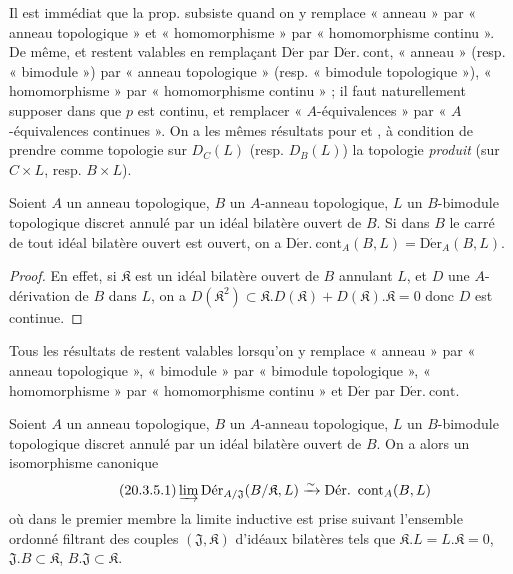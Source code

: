 \begin{env}[20.3.2]
\label{0.20.3.2-fr}
Il est immédiat que la prop.  subsiste quand on y remplace
« anneau » par « anneau topologique » et « homomorphisme » par
« homomorphisme continu ». De même,  et
 restent valables en remplaçant $\operatorname{D\acute{e}r}$ par
$\operatorname{D\acute{e}r.\ cont}$, « anneau » (resp. « bimodule ») par « anneau
topologique » (resp. « bimodule topologique »), « homomorphisme » par
« homomorphisme continu » ; il faut naturellement supposer dans
 que $p$ est continu, et remplacer « $A$-équivalences » par
« $A$-équivalences continues ». On a les mêmes résultats pour
 et , à condition de prendre comme
topologie sur $D_C(L)$ (resp. $D_B(L)$) la topologie \emph{produit} (sur
$C\times L$, resp. $B\times L$).
\end{env}

\begin{proposition}[20.3.3]
\label{0.20.3.3-fr}
Soient $A$ un anneau topologique, $B$ un $A$-anneau topologique, $L$ un
$B$-bimodule topologique discret annulé par un idéal bilatère ouvert de $B$.
Si dans $B$ le carré de tout idéal bilatère ouvert est ouvert, on a
$\operatorname{D\acute{e}r.\ cont}_A(B,L)=\operatorname{D\acute{e}r}_A(B,L)$.
\end{proposition}

\begin{proof}
En effet, si $\mathfrak{K}$ est un idéal bilatère ouvert de $B$ annulant $L$,
et $D$ une $A$-dérivation de $B$ dans $L$, on a
$D(\mathfrak{K}^2)\subset\mathfrak{K}.D(\mathfrak{K})+
D(\mathfrak{K}).\mathfrak{K}=0$  donc $D$ est continue.
\end{proof}

\begin{env}[20.3.4]
\label{0.20.3.4-fr}
Tous les résultats de  restent valables lorsqu'on y remplace
« anneau » par « anneau topologique », « bimodule » par « bimodule
topologique », « homomorphisme » par « homomorphisme continu » et
$\operatorname{D\acute{e}r}$ par $\operatorname{D\acute{e}r.\ cont}$.
\end{env}

\begin{proposition}[20.3.5]
\label{0.20.3.5-fr}
Soient $A$ un anneau topologique, $B$ un $A$-anneau topologique, $L$ un
$B$-bimodule topologique discret annulé par un idéal bilatère ouvert de $B$.
On a alors un isomorphisme canonique
\begin{equation}
\tag{20.3.5.1}
\label{0.20.3.5.1-fr}
  \varinjlim\operatorname{D\acute{e}r}_{A/\mathfrak{J}}
  (B/\mathfrak{K},L)\xrightarrow{\sim}
  \operatorname{D\acute{e}r.\ cont}_A(B,L)
\end{equation}
où dans le premier membre la limite inductive est prise suivant l'ensemble
ordonné filtrant des couples $(\mathfrak{J},\mathfrak{K})$ d'idéaux bilatères
tels que $\mathfrak{K}.L=L.\mathfrak{K}=0$,
$\mathfrak{J}.B\subset\mathfrak{K}$,
$B.\mathfrak{J}\subset\mathfrak{K}$.
\end{proposition}

